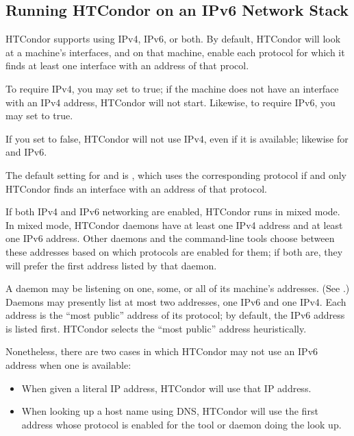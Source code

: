 \subsection{\label{sec:ipv6}Running HTCondor on an IPv6 Network Stack}

HTCondor supports using IPv4, IPv6, or both.  By default, HTCondor will
look at a machine's interfaces, and on that machine, enable each protocol
for which it finds at least one interface with an address of that procol.

To require IPv4, you may set  to true; if the
machine does not have an interface with an IPv4 address, HTCondor will
not start.  Likewise, to require IPv6, you may set 
to true.

If you set  to false, HTCondor will not use IPv4,
even if it is available; likewise for  and IPv6.

The default setting for  and  is
, which uses the corresponding protocol if and only HTCondor
finds an interface with an address of that protocol.

If both IPv4 and IPv6 networking are enabled, HTCondor runs in mixed mode.
In mixed mode, HTCondor daemons have at least one IPv4 address and at
least one IPv6 address.  Other daemons and the command-line tools choose
between these addresses based on which protocols are enabled for them; if
both are, they will prefer the first address listed by that daemon.

A daemon may be listening on one, some, or all of its machine's addresses.
(See .)  Daemons may presently list at most two
addresses, one IPv6 and one IPv4.  Each address is the ``most public''
address of its protocol; by default, the IPv6 address is listed first.
HTCondor selects the ``most public'' address heuristically.

Nonetheless, there are two cases in which HTCondor may not use an IPv6
address when one is available:
\begin{itemize}
\item{When given a literal IP address, HTCondor will use that IP address.  }
\item{When looking up a host name using DNS, HTCondor will use the first
address whose protocol is enabled for the tool or daemon doing the look up.  }
\end{itemize}

